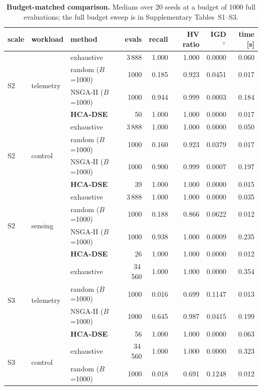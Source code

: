 \documentclass[pdflatex,sn-nature,lineno]{sn-jnl}
\begin{document}
\begin{table}[!htbp]
\centering
\caption{\textbf{Budget-matched comparison.} Medians over 20 seeds at a budget of 1000
full evaluations; the full budget sweep is in Supplementary Tables~S1--S3.}
\label{tab:ce:base}
{\setlength{\tabcolsep}{3pt}\scriptsize
\begin{tabular}{lllrrrrr}
\toprule
scale & workload & method & evals & recall & HV ratio & IGD$^{+}$ & time [s] \\
\midrule

\multirow{4}{*}{S2} & \multirow{4}{*}{telemetry} & exhaustive & 3\,888 & 1.000 & 1.000 & 0.0000 & 0.060 \\
 & & random ($B$=1000) & 1000 & 0.185 & 0.923 & 0.0451 & 0.017 \\
 & & NSGA-II ($B$=1000) & 1000 & 0.944 & 0.999 & 0.0003 & 0.184 \\
 & & \textbf{HCA-DSE} & 50 & 1.000 & 1.000 & 0.0000 & 0.017 \\
\midrule
\multirow{4}{*}{S2} & \multirow{4}{*}{control} & exhaustive & 3\,888 & 1.000 & 1.000 & 0.0000 & 0.050 \\
 & & random ($B$=1000) & 1000 & 0.160 & 0.923 & 0.0379 & 0.017 \\
 & & NSGA-II ($B$=1000) & 1000 & 0.900 & 0.999 & 0.0007 & 0.197 \\
 & & \textbf{HCA-DSE} & 39 & 1.000 & 1.000 & 0.0000 & 0.015 \\
\midrule
\multirow{4}{*}{S2} & \multirow{4}{*}{sensing} & exhaustive & 3\,888 & 1.000 & 1.000 & 0.0000 & 0.035 \\
 & & random ($B$=1000) & 1000 & 0.188 & 0.866 & 0.0622 & 0.012 \\
 & & NSGA-II ($B$=1000) & 1000 & 0.938 & 1.000 & 0.0009 & 0.235 \\
 & & \textbf{HCA-DSE} & 26 & 1.000 & 1.000 & 0.0000 & 0.012 \\
\midrule
\multirow{4}{*}{S3} & \multirow{4}{*}{telemetry} & exhaustive & 34\,560 & 1.000 & 1.000 & 0.0000 & 0.354 \\
 & & random ($B$=1000) & 1000 & 0.016 & 0.699 & 0.1147 & 0.013 \\
 & & NSGA-II ($B$=1000) & 1000 & 0.645 & 0.987 & 0.0415 & 0.199 \\
 & & \textbf{HCA-DSE} & 56 & 1.000 & 1.000 & 0.0000 & 0.063 \\
\midrule
\multirow{4}{*}{S3} & \multirow{4}{*}{control} & exhaustive & 34\,560 & 1.000 & 1.000 & 0.0000 & 0.323 \\
 & & random ($B$=1000) & 1000 & 0.018 & 0.691 & 0.1248 & 0.012 \\

\end{tabular}}
\end{table}
\end{document}
